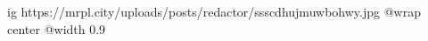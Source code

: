  
 
 
 
 

\ifcmt
  ig https://mrpl.city/uploads/posts/redactor/ssscdhujmuwbohwy.jpg
  @wrap center
  @width 0.9
\fi
